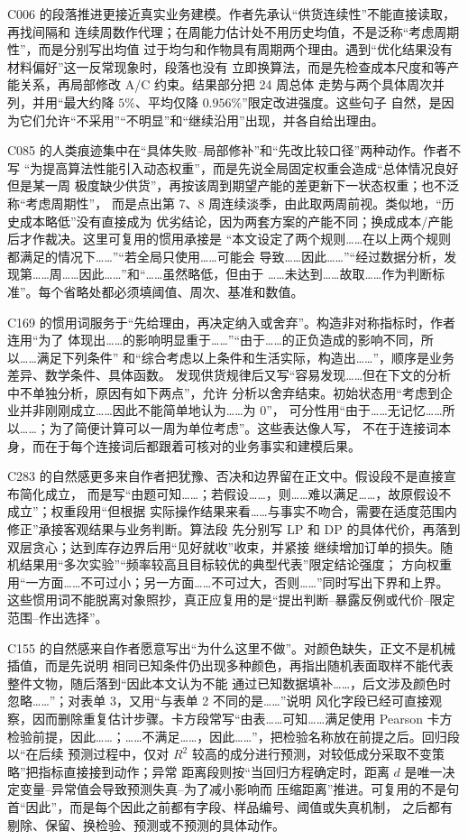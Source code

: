 C006 的段落推进更接近真实业务建模。作者先承认“供货连续性”不能直接读取，再找间隔和
连续周数作代理；在周能力估计处不用历史均值，不是泛称“考虑周期性”，而是分别写出均值
过于均匀和作物具有周期两个理由。遇到“优化结果没有材料偏好”这一反常现象时，段落也没有
立即换算法，而是先检查成本尺度和等产能关系，再局部修改 A/C 约束。结果部分把 24 周总体
走势与两个具体周次并列，并用“最大约降 $5\%$、平均仅降 $0.956\%$”限定改进强度。这些句子
自然，是因为它们允许“不采用”“不明显”和“继续沿用”出现，并各自给出理由。

C085 的人类痕迹集中在“具体失败--局部修补”和“先改比较口径”两种动作。作者不写
“为提高算法性能引入动态权重”，而是先说全局固定权重会造成“总体情况良好但是某一周
极度缺少供货”，再按该周到期望产能的差更新下一状态权重；也不泛称“考虑周期性”，
而是点出第 7、8 周连续淡季，由此取两周前视。类似地，“历史成本略低”没有直接成为
优劣结论，因为两套方案的产能不同；换成成本/产能后才作裁决。这里可复用的惯用承接是
“本文设定了两个规则……在以上两个规则都满足的情况下……”“若全局只使用……可能会
导致……因此……”“经过数据分析，发现第……周……因此……”和“……虽然略低，但由于
……未达到……故取……作为判断标准”。每个省略处都必须填阈值、周次、基准和数值。

C169 的惯用词服务于“先给理由，再决定纳入或舍弃”。构造非对称指标时，作者连用“为了
体现出……的影响明显重于……”“由于……的正负造成的影响不同，所以……满足下列条件”
和“综合考虑以上条件和生活实际，构造出……”，顺序是业务差异、数学条件、具体函数。
发现供货规律后又写“容易发现……但在下文的分析中不单独分析，原因有如下两点”，允许
分析以舍弃结束。初始状态用“考虑到企业并非刚刚成立……因此不能简单地认为……为 0”，
可分性用“由于……无记忆……所以……；为了简便计算可以一周为单位考虑”。这些表达像人写，
不在于连接词本身，而在于每个连接词后都跟着可核对的业务事实和建模后果。

C283 的自然感更多来自作者把犹豫、否决和边界留在正文中。假设段不是直接宣布简化成立，
而是写“由题可知……；若假设……，则……难以满足……，故原假设不成立”；权重段用“但根据
实际操作结果来看……与事实不吻合，需要在适度范围内修正”承接客观结果与业务判断。算法段
先分别写 LP 和 DP 的具体代价，再落到双层贪心；达到库存边界后用“见好就收”收束，并紧接
继续增加订单的损失。随机结果用“多次实验”“频率较高且目标较优的典型代表”限定结论强度；
方向权重用“一方面……不可过小；另一方面……不可过大，否则……”同时写出下界和上界。
这些惯用词不能脱离对象照抄，真正应复用的是“提出判断--暴露反例或代价--限定范围--作出选择”。

C155 的自然感来自作者愿意写出“为什么这里不做”。对颜色缺失，正文不是机械插值，而是先说明
相同已知条件仍出现多种颜色，再指出随机表面取样不能代表整件文物，随后落到“因此本文认为不能
通过已知数据填补……，后文涉及颜色时忽略……”；对表单 3，又用“与表单 2 不同的是……”说明
风化字段已经可直接观察，因而删除重复估计步骤。卡方段常写“由表……可知……满足使用 Pearson
卡方检验前提，因此……；……不满足……，因此……”，把检验名称放在前提之后。回归段以“在后续
预测过程中，仅对 $R^2$ 较高的成分进行预测，对较低成分采取不变策略”把指标直接接到动作；异常
距离段则按“当回归方程确定时，距离 $d$ 是唯一决定变量--异常值会导致预测失真--为了减小影响而
压缩距离”推进。可复用的不是句首“因此”，而是每个因此之前都有字段、样品编号、阈值或失真机制，
之后都有剔除、保留、换检验、预测或不预测的具体动作。

